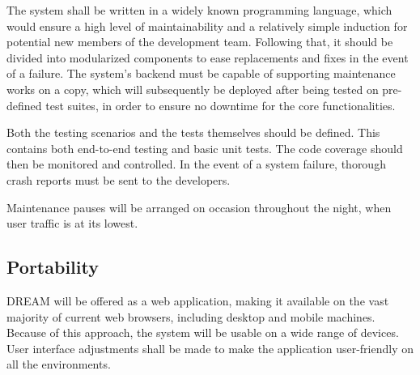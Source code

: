 The system shall be written in a widely known programming language, which would ensure a high level of maintainability and a relatively simple induction for potential new members of the development team. Following that, it should be divided into modularized components to ease replacements and fixes in the event of a failure. The system's backend must be capable of supporting maintenance works on a copy, which will subsequently be deployed after being tested on pre-defined test suites, in order to ensure no downtime for the core functionalities.

Both the testing scenarios and the tests themselves should be defined. This contains both end-to-end testing and basic unit tests. The code coverage should then be monitored and controlled. In the event of a system failure, thorough crash reports must be sent to the developers.

Maintenance pauses will be arranged on occasion throughout the night, when user traffic is at its lowest.

\subsection{Portability}

DREAM will be offered as a web application, making it available on the vast majority of current web browsers, including desktop and mobile machines. Because of this approach, the system will be usable on a wide range of devices. User interface adjustments shall be made to make the application user-friendly on all the environments.
